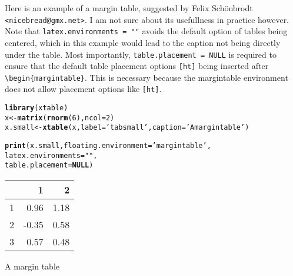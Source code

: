 \documentclass{tufte-handout}\usepackage[]{graphicx}\usepackage[]{xcolor}
\makeatletter
\newcommand{\hlnum}[1]{\textcolor[rgb]{0.686,0.059,0.569}{#1}}%
\newcommand{\hlstr}[1]{\textcolor[rgb]{0.192,0.494,0.8}{#1}}%
\newcommand{\hlstd}[1]{\textcolor[rgb]{0.345,0.345,0.345}{#1}}%
\newcommand{\hlkwa}[1]{\textcolor[rgb]{0.161,0.373,0.58}{\textbf{#1}}}%
\newcommand{\hlkwb}[1]{\textcolor[rgb]{0.69,0.353,0.396}{#1}}%
\newcommand{\hlkwc}[1]{\textcolor[rgb]{0.333,0.667,0.333}{#1}}%
\newcommand{\hlkwd}[1]{\textcolor[rgb]{0.737,0.353,0.396}{\textbf{#1}}}%
\newenvironment{kframe}{%
 \def\at@end@of@kframe{}%
 \ifinner\ifhmode%
  \def\at@end@of@kframe{\end{minipage}}%
  \begin{minipage}{\columnwidth}%
 \fi\fi%
 \def\FrameCommand##1{\hskip\@totalleftmargin \hskip-\fboxsep
 \colorbox{shadecolor}{##1}\hskip-\fboxsep
     \hskip-\linewidth \hskip-\@totalleftmargin \hskip\columnwidth}%
 \MakeFramed {\advance\hsize-\width
   \@totalleftmargin\z@ \linewidth\hsize
   \@setminipage}}%
 {\par\unskip\endMakeFramed%
 \at@end@of@kframe}
\newenvironment{knitrout}{}{} %
\makeatother
\begin{document}
Here is an example of a margin table, suggested by Felix Sch\"onbrodt
\Verb|<nicebread@gmx.net>|. I am not sure about its usefullness in
practice however. Note that \Verb|latex.environments = ""| avoids the
default option of tables being centered, which in this example would
lead to the caption not being directly under the table. Most
importantly, \Verb|table.placement = NULL| is required to ensure that
the default table placement options \Verb|[ht]| being inserted after
\Verb|\begin{margintable}|. This is necessary because the margintable
  environment does not allow placement options like \Verb|[ht]|.

\begin{knitrout}
\color{fgcolor}\begin{kframe}
\begin{alltt}
\hlkwd{library}\hlstd{(xtable)}
\hlstd{x} \hlkwb{<-} \hlkwd{matrix}\hlstd{(}\hlkwd{rnorm}\hlstd{(}\hlnum{6}\hlstd{),} \hlkwc{ncol} \hlstd{=} \hlnum{2}\hlstd{)}
\hlstd{x.small} \hlkwb{<-} \hlkwd{xtable}\hlstd{(x,} \hlkwc{label} \hlstd{=} \hlstr{'tabsmall'}\hlstd{,} \hlkwc{caption} \hlstd{=} \hlstr{'A margin table'}\hlstd{)}
\end{alltt}
\end{kframe}
\end{knitrout}

\begin{kframe}
\begin{alltt}
\hlkwd{print}\hlstd{(x.small,}\hlkwc{floating.environment}\hlstd{=}\hlstr{'margintable'}\hlstd{,}
      \hlkwc{latex.environments} \hlstd{=} \hlstr{""}\hlstd{,}
      \hlkwc{table.placement} \hlstd{=} \hlkwa{NULL}\hlstd{)}
\end{alltt}
\end{kframe}%
\begin{margintable}
\begin{tabular}{rrr}
  \hline
 & 1 & 2 \\ 
  \hline
1 & 0.96 & 1.18 \\ 
  2 & -0.35 & 0.58 \\ 
  3 & 0.57 & 0.48 \\ 
   \hline
\end{tabular}
\caption{A margin table} 
\label{tabsmall}
\end{margintable}
\end{document}
